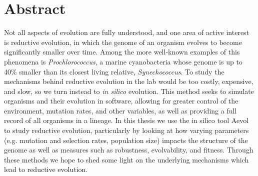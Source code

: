 




%
\newpage

\chapter*{Abstract}
Not all aspects of evolution are fully understood, and one area of active interest is reductive evolution, in which the genome of an organism evolves to become significantly smaller over time. Among the more well-known examples of this phenomena is \textit{Prochlorococcus}, a marine cyanobacteria whose genome is up to 40\% smaller than its closest living relative, \textit{Synechococcus}. To study the mechanisms behind reductive evolution in the lab would be too costly, expensive, and slow, so we turn instead to \textit{in silico} evolution. This method seeks to simulate organisms and their evolution in software, allowing for greater control of the environment, mutation rates, and other variables, as well as providing a full record of all organisms in a lineage. In this thesis we use the in silico tool Aevol to study reductive evolution, particularly by looking at how varying parameters (e.g. mutation and selection rates, population size) impacts the structure of the genome as well as measures such as robustness, evolvability, and fitness. Through these methods we hope to shed some light on the underlying mechanisms which lead to reductive evolution. 



\linespread{1.25}\selectfont

\tableofcontents
{}
\listoffigures  
\listoftables
\blankpage





%

\blankpage

\begin{appendices}
\end{appendices}


